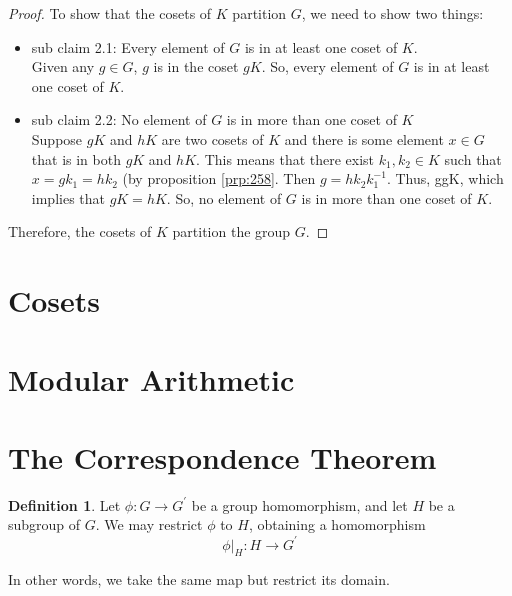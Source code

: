 \documentclass[
]{book}
\theoremstyle{definition}
\newtheorem{definition}{Definition}[chapter]
\theoremstyle{definition}
\theoremstyle{definition}
\theoremstyle{definition}
\theoremstyle{remark}
\begin{document}
\begin{proof}
To show that the cosets of \(K\) partition \(G\), we need to show two things:

\begin{itemize}
\item
  sub claim 2.1: Every element of \(G\) is in at least one coset of \(K\).\\
  Given any \(g \in G\), \(g\) is in the coset \(gK\). So, every element of \(G\) is in at least one coset of \(K\).
\item
  sub claim 2.2: No element of \(G\) is in more than one coset of \(K\)\\
  Suppose \(gK\) and \(hK\) are two cosets of \(K\) and there is some element \(x \in G\) that is in both \(gK\) and \(hK\). This means that there exist \(k_1, k_2 \in K\) such that \(x = gk_1 = hk_2\) (by proposition \ref{prp:258}. Then \(g = hk_2k_1^{-1}\). Thus, g\in gK, which implies that \(gK = hK\).
  So, no element of \(G\) is in more than one coset of \(K\).
\end{itemize}

Therefore, the cosets of \(K\) partition the group \(G\).
\end{proof}

\hypertarget{cosets}{%
\section{Cosets}\label{cosets}}

\hypertarget{modular-arithmetic}{%
\section{Modular Arithmetic}\label{modular-arithmetic}}

\hypertarget{the-correspondence-theorem}{%
\section{The Correspondence Theorem}\label{the-correspondence-theorem}}

\begin{definition}
\protect\hypertarget{def:unnamed-chunk-34}{}\label{def:unnamed-chunk-34}Let \(\phi: G \rightarrow G^\prime\) be a group homomorphism, and let \(H\) be a subgroup of \(G\). We may restrict \(\phi\) to \(H\), obtaining a homomorphism
\[\phi|_H: H \rightarrow G^\prime\]
\end{definition}

In other words, we take the same map but restrict its domain.
\end{document}
